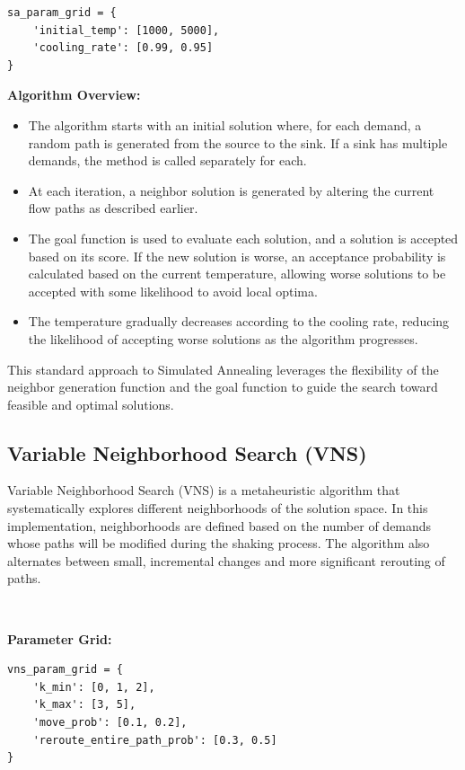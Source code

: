 \documentclass[a4paper,12pt]{article}
\begin{document}
\begin{verbatim}
sa_param_grid = {
    'initial_temp': [1000, 5000],
    'cooling_rate': [0.99, 0.95]
}
\end{verbatim}

\noindent \textbf{Algorithm Overview:}
\begin{itemize}
    \item The algorithm starts with an initial solution where, for each demand, a random path is generated from the source to the sink. If a sink has multiple demands, the method is called separately for each.
    \item At each iteration, a neighbor solution is generated by altering the current flow paths as described earlier.
    \item The goal function is used to evaluate each solution, and a solution is accepted based on its score. If the new solution is worse, an acceptance probability is calculated based on the current temperature, allowing worse solutions to be accepted with some likelihood to avoid local optima.
    
    \item The temperature gradually decreases according to the cooling rate, reducing the likelihood of accepting worse solutions as the algorithm progresses.
\end{itemize}

\noindent This standard approach to Simulated Annealing leverages the flexibility of the neighbor generation function and the goal function to guide the search toward feasible and optimal solutions.

\subsection{Variable Neighborhood Search (VNS)}

Variable Neighborhood Search (VNS) is a metaheuristic algorithm that systematically explores different neighborhoods of the solution space. In this implementation, neighborhoods are defined based on the number of demands whose paths will be modified during the shaking process. The algorithm also alternates between small, incremental changes and more significant rerouting of paths.

\

\noindent \textbf{Parameter Grid:}

\begin{verbatim}
vns_param_grid = {
    'k_min': [0, 1, 2],
    'k_max': [3, 5],
    'move_prob': [0.1, 0.2],
    'reroute_entire_path_prob': [0.3, 0.5]
}
\end{verbatim}
\end{document}
